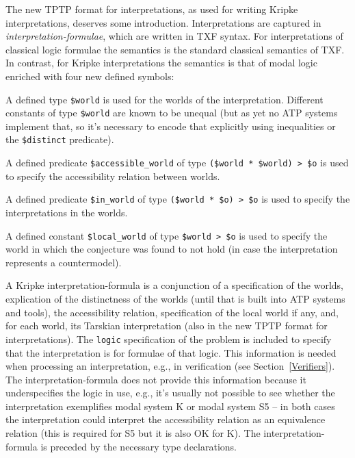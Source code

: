 \documentclass{ceurart}
\newenvironment{packed_itemize}{
\vspace*{-0.3em}
\begin{itemize}
\setlength{\partopsep}{0pt}
\setlength{\itemsep}{1pt}
\setlength{\parskip}{0pt}
\setlength{\parsep}{0pt}
}{\end{itemize}}
\begin{document}
The new TPTP format for interpretations, as used for writing Kripke interpretations, deserves 
some introduction.
Interpretations are captured in {\em interpretation-formulae}, which are written in TXF syntax.
For interpretations of classical logic formulae the semantics is the standard classical semantics 
of TXF.
In contrast, for Kripke interpretations the semantics is that of modal logic enriched with four 
new defined symbols:
\begin{packed_itemize}
\item A defined type {\tt \$world} is used for the worlds of the interpretation.
      Different constants of type {\tt \$world} are known to be unequal (but as yet no ATP 
      systems implement that, so it's necessary to encode that explicitly using inequalities or 
      the {\tt \$distinct} predicate).
\item A defined predicate {\tt \$accessible\_world} of type {\tt (\$world\,*\,\$world)\,>\,\$o}
      is used to specify the accessibility relation between worlds.
\item A defined predicate {\tt \$in\_world} of type {\tt (\$world\,*\,\$o)\,>\,\$o} is used to 
      specify the interpretations in the worlds.
\item A defined constant {\tt \$local\_world} of type {\tt \$world\,>\,\$o} is used to specify 
      the world in which the conjecture was found to not hold (in case the interpretation
      represents a countermodel).
\end{packed_itemize}
A Kripke interpretation-formula is a conjunction of 
a specification of the worlds,
explication of the distinctness of the worlds (until that is built into ATP systems and tools),
the accessibility relation,
specification of the local world if any,
and,
for each world, its Tarskian interpretation (also in the new TPTP format for interpretations).
The {\tt logic} specification of the problem is included to specify that the interpretation is
for formulae of that logic.
This information is needed when processing an interpretation, e.g., in verification (see 
Section~\ref{Verifiers}). 
The interpretation-formula does not provide this information because it underspecifies the 
logic in use, e.g., it's usually not possible to see whether the interpretation exemplifies modal 
system K or modal system S5 -- in both cases the interpretation could interpret the accessibility 
relation as an equivalence relation (this is required for S5 but it is also OK for K).
The interpretation-formula is preceded by the necessary type declarations.
\end{document}
